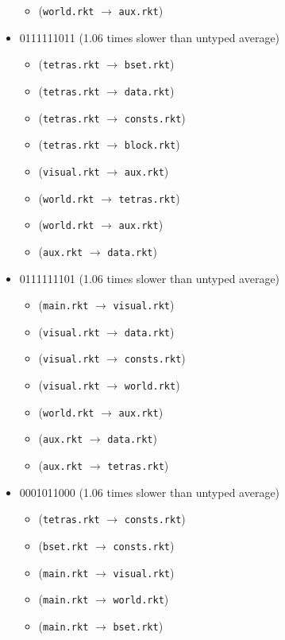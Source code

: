 \documentclass{article}
\newcommand{\mono}[1]{\texttt{#1}}
\begin{document}
\begin{itemize}
\begin{itemize}
  \item (\mono{world.rkt} $\rightarrow$ \mono{aux.rkt})
  \end{itemize}
\item 0111111011 (1.06 times slower than untyped average)
  \begin{itemize}
  \item (\mono{tetras.rkt} $\rightarrow$ \mono{bset.rkt})
  \item (\mono{tetras.rkt} $\rightarrow$ \mono{data.rkt})
  \item (\mono{tetras.rkt} $\rightarrow$ \mono{consts.rkt})
  \item (\mono{tetras.rkt} $\rightarrow$ \mono{block.rkt})
  \item (\mono{visual.rkt} $\rightarrow$ \mono{aux.rkt})
  \item (\mono{world.rkt} $\rightarrow$ \mono{tetras.rkt})
  \item (\mono{world.rkt} $\rightarrow$ \mono{aux.rkt})
  \item (\mono{aux.rkt} $\rightarrow$ \mono{data.rkt})
  \end{itemize}
\item 0111111101 (1.06 times slower than untyped average)
  \begin{itemize}
  \item (\mono{main.rkt} $\rightarrow$ \mono{visual.rkt})
  \item (\mono{visual.rkt} $\rightarrow$ \mono{data.rkt})
  \item (\mono{visual.rkt} $\rightarrow$ \mono{consts.rkt})
  \item (\mono{visual.rkt} $\rightarrow$ \mono{world.rkt})
  \item (\mono{world.rkt} $\rightarrow$ \mono{aux.rkt})
  \item (\mono{aux.rkt} $\rightarrow$ \mono{data.rkt})
  \item (\mono{aux.rkt} $\rightarrow$ \mono{tetras.rkt})
  \end{itemize}
\item 0001011000 (1.06 times slower than untyped average)
  \begin{itemize}
  \item (\mono{tetras.rkt} $\rightarrow$ \mono{consts.rkt})
  \item (\mono{bset.rkt} $\rightarrow$ \mono{consts.rkt})
  \item (\mono{main.rkt} $\rightarrow$ \mono{visual.rkt})
  \item (\mono{main.rkt} $\rightarrow$ \mono{world.rkt})
  \item (\mono{main.rkt} $\rightarrow$ \mono{bset.rkt})

\end{itemize}
\end{itemize}
\end{document}
